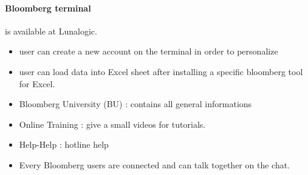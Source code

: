 \documentclass[a4paper,10pt]{article}
\begin{document}
\paragraph{Bloomberg terminal} is available at Lunalogic.
\begin{itemize}	
	\item user can create a new account on the terminal in order to personalize
	\item user can load data into Excel sheet after installing a specific bloomberg tool for Excel. 
	\item Bloomberg University (BU) : contains all general informations
	\item Online Training : give a small videos for tutorials.
	\item Help-Help : hotline help
	\item Every Bloomberg users are connected and can talk together on the chat.
\end{itemize}

\newpage


\end{document}
